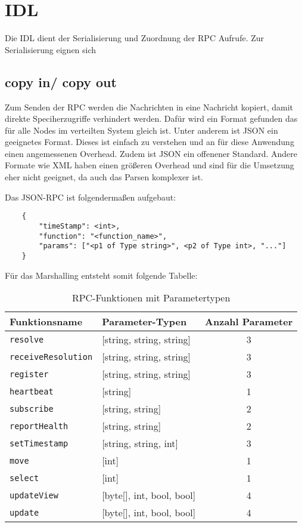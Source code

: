 \section{IDL}

Die IDL dient der Serialisierung und Zuordnung der RPC Aufrufe. Zur Serialisierung eignen sich 
\subsection{copy in/ copy out}
Zum Senden der RPC werden die Nachrichten in eine Nachricht kopiert, damit direkte Speciherzugriffe verhindert werden. Dafür wird ein Format gefunden das für alle Nodes im verteilten System gleich ist. Unter anderem ist JSON ein geeignetes Format. Dieses ist einfach zu verstehen und an für diese Anwendung einen angemessenen Overhead. Zudem ist JSON ein offenener Standard. Andere Formate wie XML haben einen größeren Overhead und sind für die Umsetzung eher nicht geeignet, da auch das Parsen komplexer ist.  


Das JSON-RPC ist folgendermaßen aufgebaut:

\begin{verbatim}
	{
		"timeStamp": <int>,
		"function": "<function_name>",
		"params": ["<p1 of Type string>", <p2 of Type int>, "..."]
	}
\end{verbatim}


Für das Marshalling entsteht somit folgende Tabelle:


\begin{table}[h!]
	\centering
	\begin{tabular}{|l|l|c|}
		\hline
		\textbf{Funktionsname} & \textbf{Parameter-Typen} & \textbf{Anzahl Parameter} \\
		\hline
		\texttt{resolve} & [string, string, string] & 3 \\
		\texttt{receiveResolution} & [string, string, string] & 3 \\
		\texttt{register} & [string, string, string] & 3 \\
		
		\texttt{heartbeat} & [string] & 1 \\
		\texttt{subscribe} & [string, string] & 2 \\
		\texttt{reportHealth} & [string, string] & 2 \\	
		
		\texttt{setTimestamp} & [string, string, int] & 3 \\
				
		\texttt{move} & [int] & 1 \\
		\texttt{select} & [int] & 1 \\
		\texttt{updateView} & [byte[], int, bool, bool] & 4 \\
		
		\texttt{update} & [byte[], int, bool, bool] & 4 \\
		
		\hline
	\end{tabular}
	\caption{RPC-Funktionen mit Parametertypen}
\end{table}


